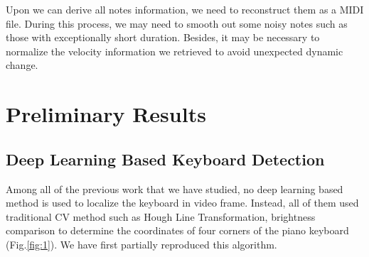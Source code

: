 \documentclass[10pt,twocolumn,letterpaper]{article}
\begin{document}
Upon we can derive all notes information, we need to reconstruct them as a MIDI file. During this process, we may need to smooth out some noisy notes such as those with exceptionally short duration. Besides, it may be necessary to normalize the velocity information we retrieved to avoid unexpected dynamic change.

\section{Preliminary Results}

\subsection{Deep Learning Based Keyboard Detection}
\label{keyboardDetection}

Among all of the previous work that we have studied, no deep learning based method is used to localize the keyboard in video frame. Instead, all of them used traditional CV method such as Hough Line Transformation, brightness comparison to determine the coordinates of four corners of the piano keyboard (Fig.\ref{fig:1}). We have first partially reproduced this algorithm.
\end{document}
